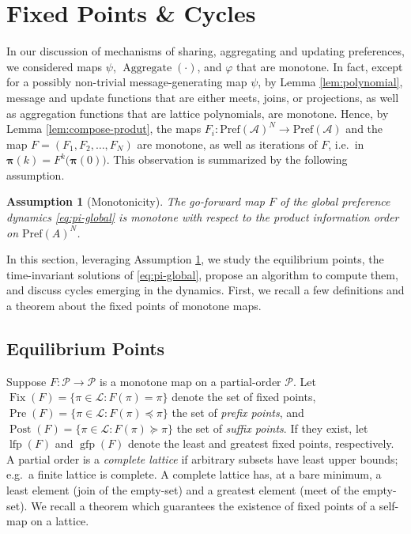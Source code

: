 \documentclass[conference]{ieeeconf}
\newcommand{\A}{\mathcal{A}}
\renewcommand{\P}{\mathcal{P}}
\newcommand{\Pref}{\mathrm{Pref}}
\renewcommand{\L}{\mathcal{L}}
\DeclareMathOperator{\Fix}{Fix}
\DeclareMathOperator{\Pre}{Pre}
\DeclareMathOperator{\Post}{Post}
\DeclareMathOperator{\lfp}{lfp}
\DeclareMathOperator{\gfp}{gfp}
\DeclareMathOperator{\Aggregate}{Aggregate}
\newtheorem{assumption}{Assumption}
\begin{document}
\section{Fixed Points \& Cycles}
\label{sec:fixed-points}

In our discussion of mechanisms of sharing, aggregating and updating preferences, we considered maps $\psi$, $\Aggregate(\cdot)$, and $\varphi$ that are monotone. In fact, except for a possibly non-trivial message-generating map $\psi$, by Lemma \ref{lem:polynomial}, message and update functions that are either meets, joins, or projections, as well as aggregation functions that are lattice polynomials, are monotone. Hence, by Lemma \ref{lem:compose-produt}, the maps $F_i: \Pref(\A)^N \to \Pref(\A)$ and the map $F = (F_1,F_2,\dots,F_N)$ are monotone, as well as iterations of $F$, i.e.~in $\boldsymbol{\pi}(k) = F^k \bigl( \boldsymbol{\pi}(0) \bigr)$. This observation is summarized by the following assumption.

\begin{assumption}[Monotonicity] \label{ass:monotone}
    The go-forward map $F$ of the global preference dynamics \eqref{eq:pi-global} is monotone with respect to the product information order on $\Pref(A)^N$.
\end{assumption}

In this section, leveraging Assumption \ref{ass:monotone}, we study the equilibrium points, the time-invariant solutions of \eqref{eq:pi-global}, propose an algorithm to compute them, and discuss cycles emerging in the dynamics. First, we recall a few definitions and a theorem about the fixed points of monotone maps. 

\subsection{Equilibrium Points}

Suppose $F: \P \to \P$ is a monotone map on a partial-order $\P$. Let $\Fix(F) = \{ \pi \in \L: F(\pi) = \pi \}$ denote the set of fixed points, $\Pre(F) = \{ \pi \in \L : F(\pi) \preceq \pi\}$ the set of \emph{prefix points}, and $\Post(F) =\{ \pi \in \L : F(\pi) \succeq \pi\}$ the set of \emph{suffix points}. If they exist, let $\lfp(F)$ and $\gfp(F)$ denote the least and greatest fixed points, respectively. A partial order is a \emph{complete lattice} if arbitrary subsets have least upper bounds; e.g.~a finite lattice is complete. A complete lattice has, at a bare minimum, a least element (join of the empty-set) and a greatest element (meet of the empty-set). We recall a theorem which guarantees the existence of fixed points of a self-map on a lattice.
\end{document}
